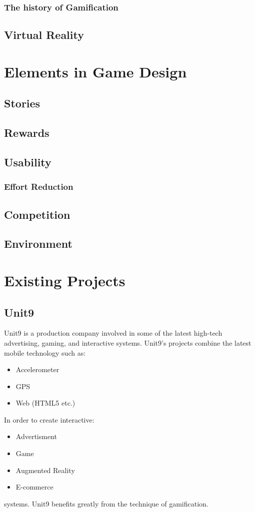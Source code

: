 \documentclass[a4,12pt]{article}
\begin{document}
\subsubsection{The history of Gamification}

\subsection{Virtual Reality}
\section{Elements in Game Design}

\subsection{Stories}
\subsection{Rewards}
\subsection{Usability}
\subsubsection{Effort Reduction}
\subsection{Competition}
\subsection{Environment}
%
\section{Existing Projects}
%
\subsection{Unit9}
Unit9 is a production company involved in some of the latest high-tech advertising, gaming, and interactive systems. Unit9's projects combine the latest mobile technology such as:
\begin{itemize}
    \item{Accelerometer}
    \item{GPS}
    \item{Web (HTML5 etc.)}
\end{itemize}
In order to create interactive:
\begin{itemize}
    \item{Advertisment}
    \item{Game}
    \item{Augmented Reality}
    \item{E-commerce}
\end{itemize}
systems.
Unit9 benefits greatly from the technique of gamification.
\end{document}
